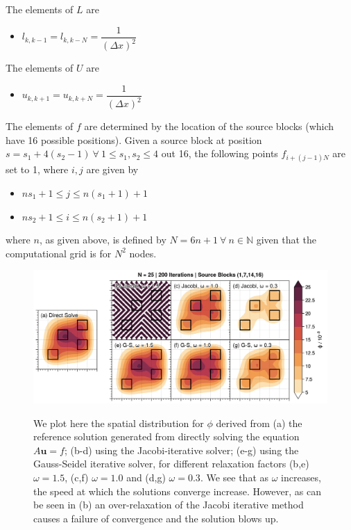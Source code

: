 \begin{enumerate}[label=(\roman*),leftmargin=*,itemsep=0mm]
    The elements of $L$ are
    \begin{itemize}[noitemsep,nolistsep]
        \item $l_{k,k-1} = l_{k,k-N} = \dfrac{1}{(\Delta x)^2}$
    \end{itemize}
    
    The elements of $U$ are
    \begin{itemize}[noitemsep,nolistsep]
        \item $u_{k,k+1} = u_{k,k+N} = \dfrac{1}{(\Delta x)^2}$
    \end{itemize}
    
    The elements of $f$ are determined by the location of the source blocks (which have 16 possible positions).  Given a source block at position $s = s_1 + 4(s_2-1) \>\forall\> 1 \leq s_1,s_2 \leq 4$ out 16, the following points $f_{i+(j-1)N}$ are set to 1, where $i,j$ are given by
    \begin{itemize}
        \item $ns_1 + 1 \leq j \leq n(s_1+1) + 1$
        \item $ns_2 + 1 \leq i \leq n(s_2+1) + 1$
    \end{itemize}
    
    where $n$, as given above, is defined by $N = 6n + 1 \> \forall \> n\in \mathbb{N}$ given that the computational grid is for $N^2$ nodes.

    \begin{figure}[h!]
    \centering
    \includegraphics[width=\textwidth]{figures/prj1_qn2_solutions.png}\\
    \caption{We plot here the spatial distribution for $\phi$ derived from (a) the reference solution generated from directly solving the equation $A\mathbf{u} = f$; (b-d) using the Jacobi-iterative solver; (e-g) using the Gauss-Seidel iterative solver, for different relaxation factors (b,e) $\omega=1.5$, (c,f) $\omega=1.0$ and (d,g) $\omega=0.3$.  We see that as $\omega$ increases, the speed at which the solutions converge increase.  However, as can be seen in (b) an over-relaxation of the Jacobi iterative method causes a failure of convergence and the solution blows up.}
    \label{prj1_qn2_sol}
    \end{figure}
    

\end{enumerate}

